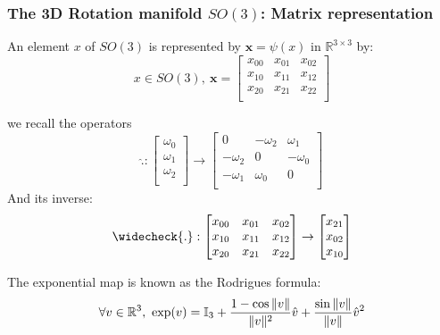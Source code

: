 \subsubsection{The 3D Rotation manifold $SO(3)$: Matrix representation}
\label{ssub:the_3d_rotation_manifold_matrix_representation}

An element $x$ of $SO(3)$ is represented by $\mathbf{x}=\psi(x)$ in $\mathbb{R}^{3\times 3}$ by:
\begin{equation}
  x\in SO(3),\ \mathbf{x} =\begin{bmatrix}
    x_{00} & x_{01} & x_{02} \\
    x_{10} & x_{11} & x_{12} \\
    x_{20} & x_{21} & x_{22} \\
  \end{bmatrix}
\end{equation}

we recall the operators
\begin{equation}
\widehat{.}: \begin{bmatrix}
  \omega_0\\\omega_1\\\omega_2\\
\end{bmatrix}
\rightarrow
\begin{bmatrix}
  0 & -\omega_2 & \omega_1 \\
  -\omega_2 & 0 & -\omega_0 \\
  -\omega_1 & \omega_0 & 0\\
\end{bmatrix}
\end{equation}
And its inverse:
\begin{equation}
\widecheck{.}: \begin{bmatrix}
    x_{00} & x_{01} & x_{02} \\
    x_{10} & x_{11} & x_{12} \\
    x_{20} & x_{21} & x_{22} \\
\end{bmatrix}
\rightarrow
\begin{bmatrix}
  x_{21}\\x_{02}\\x_{10}\\
\end{bmatrix}
\end{equation}


The exponential map is known as the Rodrigues formula:
\begin{equation}
  \forall v\in\mathbb{R}^3,\ \exp(v) = \mathbb{I}_3 + \frac{1-\cos \|v\|}{\|v\|^2} \hat{v} + \frac{\sin \|v\|}{\|v\|} \hat{v}^2\\
\end{equation}

